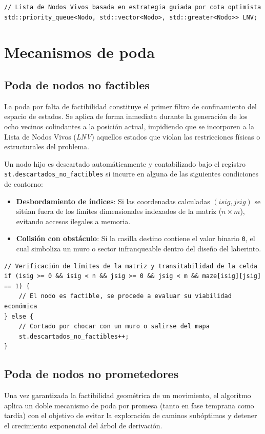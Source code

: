 \documentclass[11pt,a4paper]{article}
\begin{document}
\begin{lstlisting}[caption={Declaración de la Lista de Nodos Vivos final}, label={lst:lnv}]
// Lista de Nodos Vivos basada en estrategia guiada por cota optimista
std::priority_queue<Nodo, std::vector<Nodo>, std::greater<Nodo>> LNV;
\end{lstlisting}

\section{Mecanismos de poda}

\subsection{Poda de nodos no factibles}
La poda por falta de factibilidad constituye el primer filtro de confinamiento del espacio de estados. Se aplica de forma inmediata durante la generación de los ocho vecinos colindantes a la posición actual, impidiendo que se incorporen a la Lista de Nodos Vivos (\textit{LNV}) aquellos estados que violan las restricciones físicas o estructurales del problema.

Un nodo hijo es descartado automáticamente y contabilizado bajo el registro \texttt{st.descartados\_no\_factibles} si incurre en alguna de las siguientes condiciones de contorno:
\begin{itemize}
    \item \textbf{Desbordamiento de índices}: Si las coordenadas calculadas $(isig, jsig)$ se sitúan fuera de los límites dimensionales indexados de la matriz ($n \times m$), evitando accesos ilegales a memoria.
    \item \textbf{Colisión con obstáculo}: Si la casilla destino contiene el valor binario \texttt{0}, el cual simboliza un muro o sector infranqueable dentro del diseño del laberinto.
\end{itemize}

\begin{lstlisting}[caption={Control de factibilidad geométrica y estructural}, label={lst:poda_factibles}]
// Verificación de límites de la matriz y transitabilidad de la celda
if (isig >= 0 && isig < n && jsig >= 0 && jsig < m && maze[isig][jsig] == 1) {
    // El nodo es factible, se procede a evaluar su viabilidad económica
} else {
    // Cortado por chocar con un muro o salirse del mapa
    st.descartados_no_factibles++;
}
\end{lstlisting}

\subsection{Poda de nodos no prometedores}
Una vez garantizada la factibilidad geométrica de un movimiento, el algoritmo aplica un doble mecanismo de poda por promesa (tanto en fase temprana como tardía) con el objetivo de evitar la exploración de caminos subóptimos y detener el crecimiento exponencial del árbol de derivación.
\end{document}
